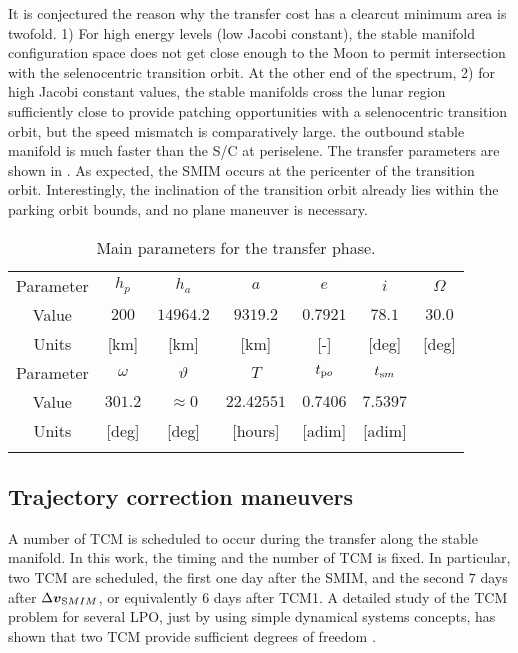\begin{figure*}[b!]
It is conjectured the reason why the transfer cost has a clearcut minimum area is twofold. 1) For high energy levels (\ie low Jacobi constant), the stable manifold configuration space does not get close enough to the Moon to permit intersection with the selenocentric transition orbit. At the other end of the spectrum, 2) for high Jacobi constant values, the stable manifolds cross the lunar region sufficiently close to provide patching opportunities with a selenocentric transition orbit, but the speed mismatch is comparatively large. \ie the outbound stable manifold is much faster than the S/C at periselene. The transfer parameters are shown in . As expected, the {SMIM} occurs at the pericenter of the transition orbit. Interestingly, the inclination of the transition orbit already lies within the parking orbit bounds, and no plane maneuver is necessary.
%
\begin{table}[h!]
	\caption{Main parameters for the transfer phase.}
	\label{tab:TranferParameters}
	\centering
	\begin{tabular}{ccccccc}
		\TOPlines
		Parameter & $h_p$ & $h_a$ & $a$ & $e$ & $i$ & $\Omega$ \\
		Value & $200$ & $14964.2$ & $9319.2$ & $0.7921$ & $78.1$ & $30.0$ \\ 
		Units & [km] & [km] & [km] & [-] & [deg] & [deg] \\
		\MIDline
		Parameter & $\omega$ & $\vartheta$ & $T$ & $t_{\textrm po}$ & $t_{\textrm sm}$ & \\
		Value & $301.2$ & $\approx0$ & $22.42551$ & $0.7406$ & $7.5397$ & \\
		Units & [deg] & [deg] & [hours] & [adim] & [adim] & \\
		\BOTTOMlines
	\end{tabular}
\end{table}
%

\subsection[Trajectory correction maneuvers]{Trajectory correction maneuvers}\label{subsec:Monte Carlo analysis for TCMs scheduling}
A number of {TCM} is scheduled to occur during the transfer along the stable manifold. In this work, the timing and the number of {TCM} is fixed. In particular, two {TCM} are scheduled, the first one day after the {SMIM}, and the second $7$ days after $\Delta\boldsymbol{v}_{\textrm SMIM}$, or equivalently $6$ days after TCM1. A detailed study of the TCM problem for several {LPO}, just by using simple dynamical systems concepts, has shown that two {TCM} provide sufficient degrees of freedom \cite{gomez2005TCM}.


\end{figure*}
